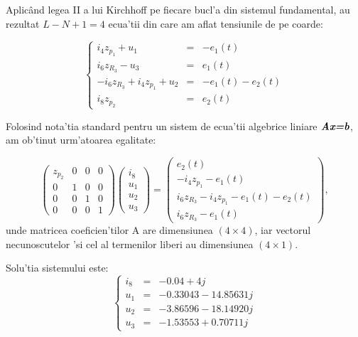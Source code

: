 \documentclass[titlepage, a4paper,12pt]{article}
\begin{document}
\newpage

Aplic\^{a}nd legea II a lui Kirchhoff pe fiecare bucl'a din sistemul fundamental, au rezultat $L-N+1 = 4$ ecua'tii din care am aflat tensiunile de pe coarde:

\begin{equation}
\left\{
\begin{array}{ccl}
i_4z_{p_1} + u_1 & = & -e_1(t) \\
i_6z_{R_3}-u_3 & = & e_1(t) \\
-i_6z_{R_3}+i_4z_{p_1}+u_2 & = & -e_1(t)-e_2(t) \\
i_8z_{p_2} & = & e_2(t)
\end{array}  
\right. \nonumber %
\end{equation}

Folosind nota'tia standard pentru un sistem de ecua'tii algebrice liniare $\textbf{\textit{Ax=b}}$, am ob'tinut urm'atoarea egalitate:

\[ \left( \begin{array}{ccccc}
z_{p_2} & 0 & 0 & 0 \\
0 & 1 & 0 & 0 \\
0 & 0 & 1 & 0 \\
0 & 0 & 0 & 1
\end{array} \right)
%
\left( \begin{array}{c}
i_8 \\
u_ 1\\
u_2 \\
u_3
\end{array} \right)
=
\left( \begin{array}{c}
e_2(t) \\
-i_4z_{p_1}-e_1(t) \\
i_6z_{R_3}-i_4z_{p_1}-e_1(t)-e_2(t) \\
i_6z_{R_3}-e_1(t)
\end{array} \right),
\]
unde matricea coeficien'tilor A are dimensiunea $(4\times4)$, iar vectorul necunoscutelor 'si cel al termenilor liberi au dimensiunea $(4\times1)$.\newline

Solu'tia sistemului este:
\begin{equation}
\left\{
\begin{array}{ccl}
i_8 & = & -0.04 +  4j \\
u_1 & = & -0.33043 - 14.85631j \\
u_2 & = & -3.86596 - 18.14920j \\
u_3 & = & -1.53553 +  0.70711j
\end{array}  
\right. \nonumber %
\end{equation}
\end{document}
